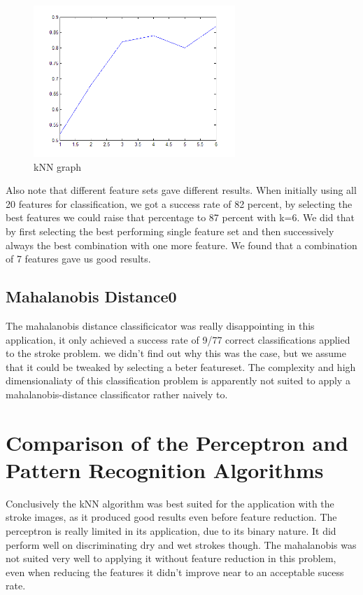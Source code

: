 \documentclass{article}
\begin{document}
\begin{figure}
    \centering
    \includegraphics[width=3.0in]{kNN_graph}
    \caption{kNN graph}
    \label{knngraph}
\end{figure}

Also note that different feature sets gave different results. When initially using all 20 features for classification, we got a success rate of 82 percent, by selecting the best features we could raise that percentage to 87 percent with k=6. We did that by first selecting the best performing single feature set and then successively always the best combination with one more feature. We found that a combination of 7 features gave us good results.

\subsection{Mahalanobis Distance0}

The mahalanobis distance classificicator was really disappointing in this application, it only achieved a success rate of 9/77 correct classifications applied to the stroke problem. we didn't find out why this was the case, but we assume that it could be tweaked by selecting a beter featureset. The complexity and high dimensionaliaty of this classification problem is apparently not suited to apply a mahalanobis-distance classificator rather naively to.

\section{Comparison of the Perceptron and Pattern Recognition Algorithms}

Conclusively the kNN algorithm was best suited for the application with the stroke images, as it produced good results even before feature reduction. The perceptron is really limited in its application, due to its binary nature. It did perform well on discriminating dry and wet strokes though. The mahalanobis was not suited very well to applying it without feature reduction in this problem, even when reducing the features it didn't improve near to an acceptable sucess rate.
\end{document}
